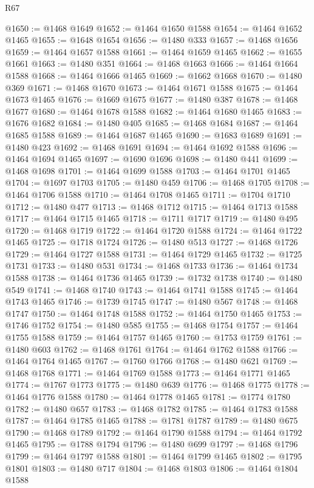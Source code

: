 \begin{lexlean}{R67}
\begin{coremodule}
@1650 := @1468 @1649
@1652 := @1464 @1650 @1588
@1654 := @1464 @1652 @1465
@1655 := @1648 @1654
@1656 := @1480 @333
@1657 := @1468 @1656
@1659 := @1464 @1657 @1588
@1661 := @1464 @1659 @1465
@1662 := @1655 @1661
@1663 := @1480 @351
@1664 := @1468 @1663
@1666 := @1464 @1664 @1588
@1668 := @1464 @1666 @1465
@1669 := @1662 @1668
@1670 := @1480 @369
@1671 := @1468 @1670
@1673 := @1464 @1671 @1588
@1675 := @1464 @1673 @1465
@1676 := @1669 @1675
@1677 := @1480 @387
@1678 := @1468 @1677
@1680 := @1464 @1678 @1588
@1682 := @1464 @1680 @1465
@1683 := @1676 @1682
@1684 := @1480 @405
@1685 := @1468 @1684
@1687 := @1464 @1685 @1588
@1689 := @1464 @1687 @1465
@1690 := @1683 @1689
@1691 := @1480 @423
@1692 := @1468 @1691
@1694 := @1464 @1692 @1588
@1696 := @1464 @1694 @1465
@1697 := @1690 @1696
@1698 := @1480 @441
@1699 := @1468 @1698
@1701 := @1464 @1699 @1588
@1703 := @1464 @1701 @1465
@1704 := @1697 @1703
@1705 := @1480 @459
@1706 := @1468 @1705
@1708 := @1464 @1706 @1588
@1710 := @1464 @1708 @1465
@1711 := @1704 @1710
@1712 := @1480 @477
@1713 := @1468 @1712
@1715 := @1464 @1713 @1588
@1717 := @1464 @1715 @1465
@1718 := @1711 @1717
@1719 := @1480 @495
@1720 := @1468 @1719
@1722 := @1464 @1720 @1588
@1724 := @1464 @1722 @1465
@1725 := @1718 @1724
@1726 := @1480 @513
@1727 := @1468 @1726
@1729 := @1464 @1727 @1588
@1731 := @1464 @1729 @1465
@1732 := @1725 @1731
@1733 := @1480 @531
@1734 := @1468 @1733
@1736 := @1464 @1734 @1588
@1738 := @1464 @1736 @1465
@1739 := @1732 @1738
@1740 := @1480 @549
@1741 := @1468 @1740
@1743 := @1464 @1741 @1588
@1745 := @1464 @1743 @1465
@1746 := @1739 @1745
@1747 := @1480 @567
@1748 := @1468 @1747
@1750 := @1464 @1748 @1588
@1752 := @1464 @1750 @1465
@1753 := @1746 @1752
@1754 := @1480 @585
@1755 := @1468 @1754
@1757 := @1464 @1755 @1588
@1759 := @1464 @1757 @1465
@1760 := @1753 @1759
@1761 := @1480 @603
@1762 := @1468 @1761
@1764 := @1464 @1762 @1588
@1766 := @1464 @1764 @1465
@1767 := @1760 @1766
@1768 := @1480 @621
@1769 := @1468 @1768
@1771 := @1464 @1769 @1588
@1773 := @1464 @1771 @1465
@1774 := @1767 @1773
@1775 := @1480 @639
@1776 := @1468 @1775
@1778 := @1464 @1776 @1588
@1780 := @1464 @1778 @1465
@1781 := @1774 @1780
@1782 := @1480 @657
@1783 := @1468 @1782
@1785 := @1464 @1783 @1588
@1787 := @1464 @1785 @1465
@1788 := @1781 @1787
@1789 := @1480 @675
@1790 := @1468 @1789
@1792 := @1464 @1790 @1588
@1794 := @1464 @1792 @1465
@1795 := @1788 @1794
@1796 := @1480 @699
@1797 := @1468 @1796
@1799 := @1464 @1797 @1588
@1801 := @1464 @1799 @1465
@1802 := @1795 @1801
@1803 := @1480 @717
@1804 := @1468 @1803
@1806 := @1464 @1804 @1588

\end{coremodule}
\end{lexlean}
